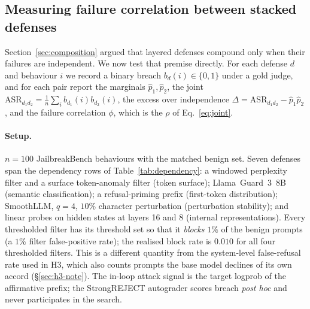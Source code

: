 %

\subsection{Measuring failure correlation between stacked defenses}
\label{sec:corr-measure}

Section~\ref{sec:composition} argued that layered defenses compound only when their failures
are independent. We now test that premise directly. For each defense $d$ and behaviour $i$
we record a binary breach $b_d(i)\in\{0,1\}$ under a gold judge, and for each pair report
the marginals $\hat p_1,\hat p_2$, the joint
$\mathrm{ASR}_{d_1d_2}=\tfrac1n\sum_i b_{d_1}(i)b_{d_2}(i)$, the excess over independence
$\Delta=\mathrm{ASR}_{d_1d_2}-\hat p_1\hat p_2$, and the failure correlation $\phi$, which is
the $\rho$ of Eq.~\eqref{eq:joint}.

\paragraph{Setup.}
$n=100$ JailbreakBench behaviours with the matched benign set. Seven defenses span the
dependency rows of Table~\ref{tab:dependency}: a windowed perplexity filter and a surface
token-anomaly filter (token surface); Llama~Guard~3~8B (semantic classification); a
refusal-priming prefix (first-token distribution); SmoothLLM, $q{=}4$, $10\%$ character
perturbation (perturbation stability); and linear probes on hidden states at layers 16 and 8
(internal representations). Every thresholded filter has its threshold set so that it
\emph{blocks} $1\%$ of the benign prompts (a $1\%$ filter false-positive rate); the realised
block rate is $0.010$ for all four thresholded filters. This is a different quantity from the
system-level false-refusal rate used in H3, which also counts prompts the base model declines
of its own accord (\S\ref{sec:h3-note}). The in-loop attack signal is the target logprob of the affirmative
prefix; the StrongREJECT autograder scores breach \emph{post hoc} and never participates in
the search.

